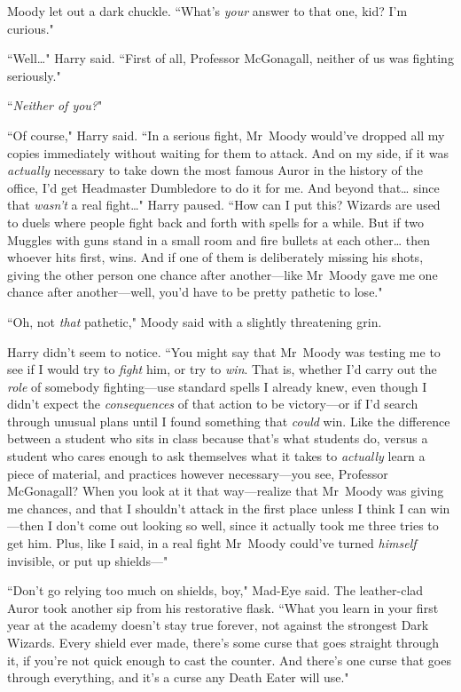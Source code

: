 Moody let out a dark chuckle. ``What's \emph{your} answer to that one, kid? I'm curious."

``Well{\ldots}" Harry said. ``First of all, Professor McGonagall, neither of us was fighting seriously."

``\emph{Neither of you?}"

``Of course," Harry said. ``In a serious fight, Mr~Moody would've dropped all my copies immediately without waiting for them to attack. And on my side, if it was \emph{actually} necessary to take down the most famous Auror in the history of the office, I'd get Headmaster Dumbledore to do it for me. And beyond that{\ldots} since that \emph{wasn't} a real fight{\ldots}" Harry paused. ``How can I put this? Wizards are used to duels where people fight back and forth with spells for a while. But if two Muggles with guns stand in a small room and fire bullets at each other{\ldots} then whoever hits first, wins. And if one of them is deliberately missing his shots, giving the other person one chance after another—like Mr~Moody gave me one chance after another—well, you'd have to be pretty pathetic to lose."

``Oh, not \emph{that} pathetic," Moody said with a slightly threatening grin.

Harry didn't seem to notice. ``You might say that Mr~Moody was testing me to see if I would try to \emph{fight} him, or try to \emph{win}. That is, whether I'd carry out the \emph{role} of somebody fighting—use standard spells I already knew, even though I didn't expect the \emph{consequences} of that action to be victory—or if I'd search through unusual plans until I found something that \emph{could} win. Like the difference between a student who sits in class because that's what students do, versus a student who cares enough to ask themselves what it takes to \emph{actually} learn a piece of material, and practices however necessary—you see, Professor McGonagall? When you look at it that way—realize that Mr~Moody was giving me chances, and that I shouldn't attack in the first place unless I think I can win—then I don't come out looking so well, since it actually took me three tries to get him. Plus, like I said, in a real fight Mr~Moody could've turned \emph{himself} invisible, or put up shields—"

``Don't go relying too much on shields, boy," Mad-Eye said. The leather-clad Auror took another sip from his restorative flask. ``What you learn in your first year at the academy doesn't stay true forever, not against the strongest Dark Wizards. Every shield ever made, there's some curse that goes straight through it, if you're not quick enough to cast the counter. And there's one curse that goes through everything, and it's a curse any Death Eater will use."

